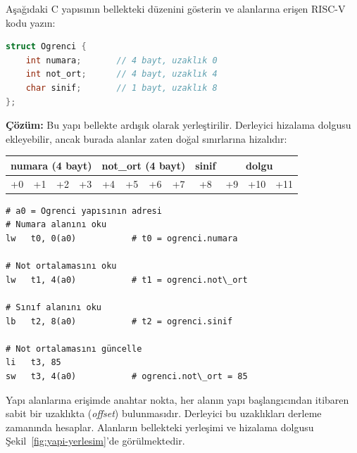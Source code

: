 \begin{ornek}[4.12]
\label{orn:struct}
Aşağıdaki C yapısının bellekteki düzenini gösterin ve alanlarına erişen RISC-V kodu yazın:

\begin{lstlisting}[language=C, style=alistirma-kod]
struct Ogrenci {
    int numara;       // 4 bayt, uzaklık 0
    int not_ort;      // 4 bayt, uzaklık 4
    char sinif;       // 1 bayt, uzaklık 8
};
\end{lstlisting}

\textbf{Çözüm:} Bu yapı bellekte ardışık olarak yerleştirilir. Derleyici hizalama dolgusu ekleyebilir, ancak burada alanlar zaten doğal sınırlarına hizalıdır:

\begin{center}
\small
\begin{tabular}{|c|c|c|c|c|c|c|c|c|c|c|c|}
\hline
\multicolumn{4}{|c|}{numara (4 bayt)} & \multicolumn{4}{c|}{not\_ort (4 bayt)} & sinif & \multicolumn{3}{c|}{dolgu} \\
\hline
+0 & +1 & +2 & +3 & +4 & +5 & +6 & +7 & +8 & +9 & +10 & +11 \\
\hline
\end{tabular}
\end{center}

\begin{lstlisting}[style=riscv]
# a0 = Ogrenci yapısının adresi
# Numara alanını oku
lw   t0, 0(a0)           # t0 = ogrenci.numara

# Not ortalamasını oku
lw   t1, 4(a0)           # t1 = ogrenci.not\_ort

# Sınıf alanını oku
lb   t2, 8(a0)           # t2 = ogrenci.sinif

# Not ortalamasını güncelle
li   t3, 85
sw   t3, 4(a0)           # ogrenci.not\_ort = 85
\end{lstlisting}

Yapı alanlarına erişimde anahtar nokta, her alanın yapı başlangıcından itibaren sabit bir uzaklıkta (\emph{offset}) bulunmasıdır. Derleyici bu uzaklıkları derleme zamanında hesaplar. Alanların bellekteki yerleşimi ve hizalama dolgusu Şekil~\ref{fig:yapi-yerlesim}'de görülmektedir.
\end{ornek}


